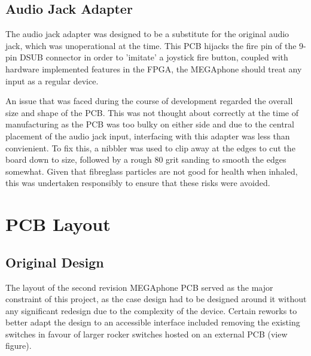\subsection{Audio Jack Adapter}

The audio jack adapter was designed to be a substitute for the original audio jack, which was unoperational at the time.
This PCB hijacks the fire pin of the 9-pin DSUB connector in order to 'imitate' a joystick fire button, coupled with hardware implemented features in the FPGA, the MEGAphone should treat any input as a regular device.

An issue that was faced during the course of development regarded the overall size and shape of the PCB.
This was not thought about correctly at the time of manufacturing as the PCB was too bulky on either side and due to the central placement of the audio jack input, interfacing with this adapter was less than convienient.
To fix this, a nibbler was used to clip away at the edges to cut the board down to size, followed by a rough 80 grit sanding to smooth the edges somewhat.
Given that fibreglass particles are not good for health when inhaled, this was undertaken responsibly to ensure that these risks were avoided.


\section{PCB Layout}  %


\subsection{Original Design}

The layout of the second revision MEGAphone PCB served as the major constraint of this project, as the case design had to be designed around it without any significant redesign due to the complexity of the device. 
Certain reworks to better adapt the design to an accessible interface included removing the existing switches in favour of larger rocker switches hosted on an external PCB (view figure).


